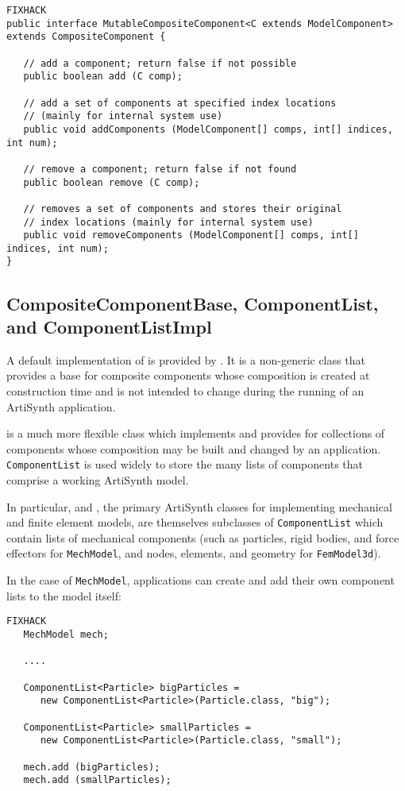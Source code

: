 \documentclass{article}
\begin{document}
\begin{lstlisting}FIXHACK
public interface MutableCompositeComponent<C extends ModelComponent>
extends CompositeComponent {

   // add a component; return false if not possible
   public boolean add (C comp);

   // add a set of components at specified index locations
   // (mainly for internal system use)
   public void addComponents (ModelComponent[] comps, int[] indices, int num);

   // remove a component; return false if not found
   public boolean remove (C comp);

   // removes a set of components and stores their original 
   // index locations (mainly for internal system use)
   public void removeComponents (ModelComponent[] comps, int[] indices, int num);
}
\end{lstlisting}

\subsection{CompositeComponentBase, ComponentList, and
ComponentListImpl}
\label{CompositeComponentBaseSec}

A default implementation of  is provided
by . It is a non-generic class that
provides a base for composite components whose composition is created
at construction time and is not intended to change during the
running of an ArtiSynth application.

 is a much more flexible class which
implements  and provides for
collections of components whose composition may be built and changed
by an application. {\tt ComponentList} is used widely to store the
many lists of components that comprise a working ArtiSynth model.

\javabase[]

In particular,  and
, the primary
ArtiSynth classes for implementing mechanical and finite element
models, are themselves subclasses of {\tt ComponentList} 
which contain lists of mechanical components (such as
particles, rigid bodies, and force effectors for {\tt MechModel},
and nodes, elements, and geometry for {\tt FemModel3d}).

In the case of {\tt MechModel}, applications can create and add their
own component lists to the model itself:
\begin{lstlisting}FIXHACK
   MechModel mech; 

   ....

   ComponentList<Particle> bigParticles =
      new ComponentList<Particle>(Particle.class, "big");

   ComponentList<Particle> smallParticles =
      new ComponentList<Particle>(Particle.class, "small");

   mech.add (bigParticles);
   mech.add (smallParticles);
\end{lstlisting}
\end{document}
